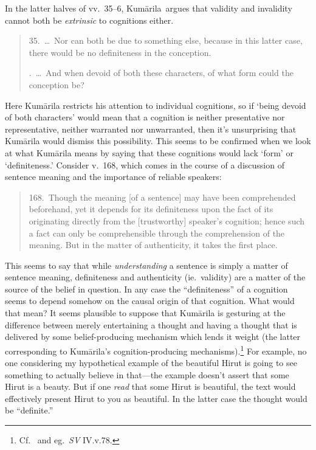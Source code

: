 \documentclass[11pt,letterpaper,oneside]{amsart}
\newenvironment{squote}{\begin{quote}\sf\small}{\rm\end{quote}} %
\newcommand{\kum}{Kum\={a}rila}
\begin{document}

In the latter halves of vv.\ 35--6, \kum\ argues that validity and invalidity cannot both be \emph{extrinsic} to cognitions either.\begin{squote} 35.\ \ldots\ Nor can both be due to something else, because in this latter case, there would be no definiteness in the conception.

.\ \ldots\ And when devoid of both these characters, of what form could the conception be?\end{squote}Here Kum\=arila restricts his attention to individual cognitions, so if `being devoid of both characters' would mean that a cognition is neither presentative nor representative, neither warranted nor unwarranted, then it's unsurprising that Kum\=arila would dismiss this possibility. This seems to be confirmed when we look at what Kum\=arila means by saying that these cognitions would lack `form' or `definiteness.' Consider v.\ 168, which comes in the course of a discussion of sentence meaning and the importance of reliable speakers:\begin{squote}168.\ Though the meaning [of a sentence] may have been comprehended beforehand, yet it depends for its definiteness upon the fact of its originating directly from the [trustworthy] speaker's cognition; hence such a fact can only be comprehensible through the comprehension of the meaning. But in the matter of authenticity, it takes the first place.\end{squote} This seems to say that while \emph{understanding} a sentence is simply a matter of sentence meaning, definiteness and authenticity (ie.\ validity) are a matter of the source of the belief in question. In any case the ``definiteness'' of a cognition seems to depend somehow on the causal origin of that cognition. What would that mean? It seems plausible to suppose that Kum\=arila is gesturing at the difference between merely entertaining a thought and having a thought that is delivered by some belief-producing mechanism which lends it weight (the latter corresponding to \kum's cognition-producing mechanisms).\footnote{Cf.\ \citet[ch.\ 1]{sen1984concept} and eg.\ \emph{SV} IV.v.78.} For example, no one considering my hypothetical example of the beautiful Hirut is going to see something to actually believe in that---the example doesn't assert that some Hirut is a beauty. But if one \emph{read} that some Hirut is beautiful, the text would effectively present Hirut to you as beautiful. In the latter case the thought would be ``definite.''
\end{document}

